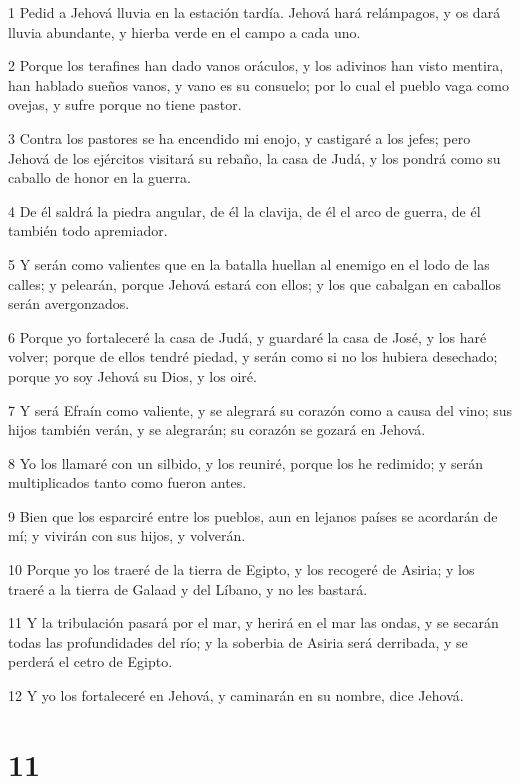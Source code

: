 \par 1 Pedid a Jehová lluvia en la estación tardía. Jehová hará relámpagos, y os dará lluvia abundante, y hierba verde en el campo a cada uno.
\par 2 Porque los terafines han dado vanos oráculos, y los adivinos han visto mentira, han hablado sueños vanos, y vano es su consuelo; por lo cual el pueblo vaga como ovejas, y sufre porque no tiene pastor. 
\par 3 Contra los pastores se ha encendido mi enojo, y castigaré a los jefes; pero Jehová de los ejércitos visitará su rebaño, la casa de Judá, y los pondrá como su caballo de honor en la guerra.
\par 4 De él saldrá la piedra angular, de él la clavija, de él el arco de guerra, de él también todo apremiador.
\par 5 Y serán como valientes que en la batalla huellan al enemigo en el lodo de las calles; y pelearán, porque Jehová estará con ellos; y los que cabalgan en caballos serán avergonzados.
\par 6 Porque yo fortaleceré la casa de Judá, y guardaré la casa de José, y los haré volver; porque de ellos tendré piedad, y serán como si no los hubiera desechado; porque yo soy Jehová su Dios, y los oiré.
\par 7 Y será Efraín como valiente, y se alegrará su corazón como a causa del vino; sus hijos también verán, y se alegrarán; su corazón se gozará en Jehová.
\par 8 Yo los llamaré con un silbido, y los reuniré, porque los he redimido; y serán multiplicados tanto como fueron antes.
\par 9 Bien que los esparciré entre los pueblos, aun en lejanos países se acordarán de mí; y vivirán con sus hijos, y volverán.
\par 10 Porque yo los traeré de la tierra de Egipto, y los recogeré de Asiria; y los traeré a la tierra de Galaad y del Líbano, y no les bastará.
\par 11 Y la tribulación pasará por el mar, y herirá en el mar las ondas, y se secarán todas las profundidades del río; y la soberbia de Asiria será derribada, y se perderá el cetro de Egipto.
\par 12 Y yo los fortaleceré en Jehová, y caminarán en su nombre, dice Jehová.

\chapter{11}

